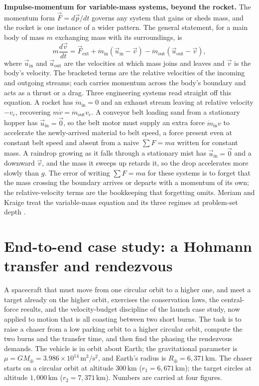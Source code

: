 

\begin{mastery}
\textbf{Impulse-momentum for variable-mass systems, beyond the
rocket.} The momentum form $\vec{F}=d\vec{p}/dt$ governs any system
that gains or sheds mass, and the rocket is one instance of a wider
pattern. The general statement, for a main body of mass $m$ exchanging
mass with its surroundings, is
\[
m\frac{d\vec{v}}{dt}=\vec{F}_{\text{ext}}+\dot{m}_{\text{in}}
(\vec{u}_{\text{in}}-\vec{v})-\dot{m}_{\text{out}}(\vec{u}_{\text{out}}
-\vec{v}),
\]
where $\vec{u}_{\text{in}}$ and $\vec{u}_{\text{out}}$ are the
velocities at which mass joins and leaves and $\vec{v}$ is the body's
velocity. The bracketed terms are the relative velocities of the
incoming and outgoing streams; each carries momentum across the body's
boundary and acts as a thrust or a drag. Three engineering systems
read straight off this equation. A rocket has $\dot{m}_{\text{in}}=0$
and an exhaust stream leaving at relative velocity $-v_{e}$, recovering
$m\dot{v}=\dot{m}_{\text{out}}v_{e}$. A conveyor belt loading sand
from a stationary hopper has $\vec{u}_{\text{in}}=\vec{0}$, so the belt
motor must supply an extra force $\dot{m}_{\text{in}}v$ to accelerate
the newly-arrived material to belt speed, a force present even at
constant belt speed and absent from a naive $\sum F=ma$ written for
constant mass. A raindrop growing as it falls through a stationary mist
has $\vec{u}_{\text{in}}=\vec{0}$ and a downward $\vec{v}$, and the
mass it sweeps up retards it, so the drop accelerates more slowly than
$g$. The error of writing $\sum F=ma$ for these systems is to forget
that the mass crossing the boundary arrives or departs with a momentum
of its own; the relative-velocity terms are the bookkeeping that
forgetting omits. Meriam and Kraige treat the variable-mass equation
and its three regimes at problem-set depth
\cite{text:meriam-kraige2018}.
\end{mastery}

\section{End-to-end case study: a Hohmann transfer and
rendezvous}

A spacecraft that must move from one circular orbit to a higher one,
and meet a target already on the higher orbit, exercises the
conservation laws, the central-force results, and the velocity-budget
discipline of the launch case study, now applied to motion that is all
coasting between two short burns. The task is to raise a chaser from a
low parking orbit to a higher circular orbit, compute the two burns and
the transfer time, and then find the phasing the rendezvous demands.
The vehicle is in orbit about Earth; the gravitational parameter is
$\mu=GM_{\oplus}=3.986\times 10^{14}\,\si{\meter\cubed\per\second
\squared}$, and Earth's radius is $R_{\oplus}=6{,}371\,\si{\kilo\meter}$.
The chaser starts on a circular orbit at altitude $300\,\si{\kilo
\meter}$ ($r_{1}=6{,}671\,\si{\kilo\meter}$); the target circles at
altitude $1{,}000\,\si{\kilo\meter}$ ($r_{2}=7{,}371\,\si{\kilo\meter}$).
Numbers are carried at four figures.

